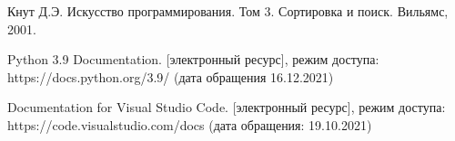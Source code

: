 \renewcommand\bibname{Список литературы}
\begin{thebibliography}{3}
	Кнут Д.Э. Искусство программирования. Том 3. Сортировка и поиск. Вильямс, 2001.
	
	Python 3.9 Documentation. [электронный ресурс], режим доступа: https://docs.python.org/3.9/ (дата обращения 16.12.2021)
	
	Documentation for Visual Studio Code. [электронный ресурс], режим доступа: https://code.visualstudio.com/docs (дата обращения: 19.10.2021)
	
\end{thebibliography}